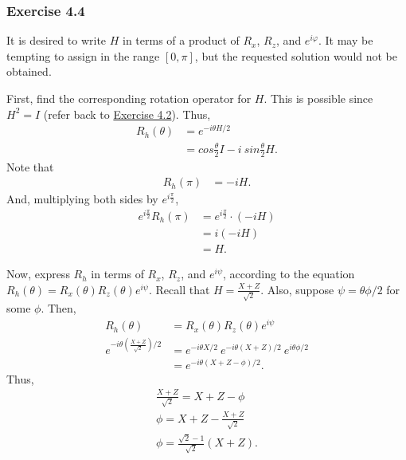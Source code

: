 
\subsubsection{Exercise 4.4}

It is desired to write $H$ in terms of a product of $R_x$, $R_z$, and $e^{i\varphi}$.
It may be tempting to assign in the range $[0, \pi]$,
but the requested solution would not be obtained.

First, find the corresponding rotation operator for $H$.
This is possible since $H^2 = I$
(refer back to \hyperref[sec:nielsen-and-chuang-exercise-4-2]{Exercise 4.2}).
Thus,
\begin{align}
    R_h(\theta) &= e^{-i \theta H / 2} \\
    &= cos \frac\theta2 I - i\ sin \frac\theta2 H.
\end{align}
Note that
\begin{align}
    R_h(\pi) &= -i H.
\end{align}
And, multiplying both sides by $e^{i \frac \pi 2}$,
\begin{align}
    \label{eq:nielsen-and-chuang-exercise-4-4-e-rh}
    e^{i \frac \pi 2} R_h(\pi) &= e^{i \frac \pi 2} \cdot (-i H) \\
    &= i (-i H) \\
    \label{eq:nielsen-and-chuang-exercise-4-4-h}
    &= H.
\end{align}

Now, express $R_h$ in terms of $R_x$, $R_z$, and $e^{i\psi}$,
according to the equation $R_h(\theta) = R_x(\theta) R_z(\theta) e^{i\psi}$.
Recall that $H = \frac{X + Z}{\sqrt 2}$.
Also, suppose $\psi = \theta \phi / 2$ for some $\phi$.
Then,
\begin{align}
    R_h(\theta) &= R_x(\theta) R_z(\theta) e^{i\psi} \\
    e^{-i \theta (\frac{X + Z}{\sqrt 2}) / 2} &=
        e^{-i \theta X / 2}\ e^{-i \theta (X + Z) / 2}\ e^{i \theta \phi / 2} \\
    &= e^{-i \theta (X + Z - \phi) / 2}.
\end{align}
Thus,
\begin{align}
    \frac{X + Z}{\sqrt 2} = X + Z - \phi \\
    \phi = X + Z - \frac{X + Z}{\sqrt 2} \\
    \phi = \frac{\sqrt2 - 1}{\sqrt 2} (X + Z).
\end{align}


